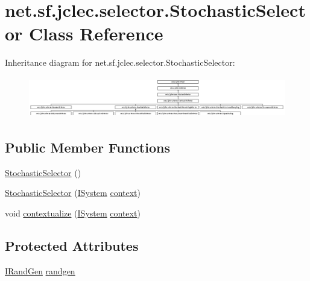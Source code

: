 \hypertarget{classnet_1_1sf_1_1jclec_1_1selector_1_1_stochastic_selector}{\section{net.\-sf.\-jclec.\-selector.\-Stochastic\-Selector Class Reference}
\label{classnet_1_1sf_1_1jclec_1_1selector_1_1_stochastic_selector}
}
Inheritance diagram for net.\-sf.\-jclec.\-selector.\-Stochastic\-Selector\-:\begin{figure}[H]
\begin{center}
\leavevmode
\includegraphics[height=1.800643cm]{classnet_1_1sf_1_1jclec_1_1selector_1_1_stochastic_selector}
\end{center}
\end{figure}
\subsection*{Public Member Functions}
\begin{DoxyCompactItemize}
\item 
\hyperlink{classnet_1_1sf_1_1jclec_1_1selector_1_1_stochastic_selector_a6c3ec510760db2dd2531d3a235c01571}{Stochastic\-Selector} ()
\item 
\hyperlink{classnet_1_1sf_1_1jclec_1_1selector_1_1_stochastic_selector_ac0159ea2309a4c92d6f9177c3e75cf2e}{Stochastic\-Selector} (\hyperlink{interfacenet_1_1sf_1_1jclec_1_1_i_system}{I\-System} \hyperlink{classnet_1_1sf_1_1jclec_1_1base_1_1_abstract_selector_a4304fe5c27aa7631dc91678d22473b94}{context})
\item 
void \hyperlink{classnet_1_1sf_1_1jclec_1_1selector_1_1_stochastic_selector_a8230658188434a2f123d01c19f136969}{contextualize} (\hyperlink{interfacenet_1_1sf_1_1jclec_1_1_i_system}{I\-System} \hyperlink{classnet_1_1sf_1_1jclec_1_1base_1_1_abstract_selector_a4304fe5c27aa7631dc91678d22473b94}{context})
\end{DoxyCompactItemize}
\subsection*{Protected Attributes}
\begin{DoxyCompactItemize}
\item 
\hyperlink{interfacenet_1_1sf_1_1jclec_1_1util_1_1random_1_1_i_rand_gen}{I\-Rand\-Gen} \hyperlink{classnet_1_1sf_1_1jclec_1_1selector_1_1_stochastic_selector_af3056c2c49a9c9e6b6fb862c04b7b50b}{randgen}
\end{DoxyCompactItemize}
